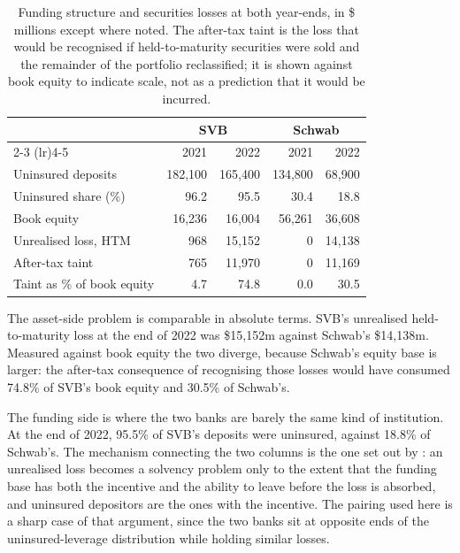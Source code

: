 \begin{table}[htbp]
\centering
\caption{Funding structure and securities losses at both year-ends, in \$ millions
except where noted. The after-tax taint is the loss that would be recognised if
held-to-maturity securities were sold and the remainder of the portfolio
reclassified; it is shown against book equity to indicate scale, not as a
prediction that it would be incurred.}
\label{tab:objects}
\small
\begin{tabular}{lrrrr}
\toprule
 & \multicolumn{2}{c}{SVB} & \multicolumn{2}{c}{Schwab} \\
\cmidrule(lr){2-3} \cmidrule(lr){4-5}
 & 2021 & 2022 & 2021 & 2022 \\
\midrule
Uninsured deposits          & 182,100 & 165,400 & 134,800 & 68,900 \\
Uninsured share (\%)        & 96.2    & 95.5    & 30.4    & 18.8 \\
Book equity                 & 16,236  & 16,004  & 56,261  & 36,608 \\
Unrealised loss, HTM        & 968     & 15,152  & 0       & 14,138 \\
After-tax taint             & 765     & 11,970  & 0       & 11,169 \\
Taint as \% of book equity  & 4.7     & 74.8    & 0.0     & 30.5 \\
\bottomrule
\end{tabular}
\end{table}

The asset-side problem is comparable in absolute terms. SVB's unrealised
held-to-maturity loss at the end of 2022 was \$15,152m against Schwab's
\$14,138m. Measured against book equity the two diverge, because Schwab's equity
base is larger: the after-tax consequence of recognising those losses would have
consumed 74.8\% of SVB's book equity and 30.5\% of Schwab's.

The funding side is where the two banks are barely the same kind of institution.
At the end of 2022, 95.5\% of SVB's deposits were uninsured, against 18.8\% of
Schwab's. The mechanism connecting the two columns is the one set out by
\citet{Jiang2024}: an unrealised loss becomes a solvency problem only to the
extent that the funding base has both the incentive and the ability to leave
before the loss is absorbed, and uninsured depositors are the ones with the
incentive. The pairing used here is a sharp case of that argument, since the two
banks sit at opposite ends of the uninsured-leverage distribution while holding
similar losses.

